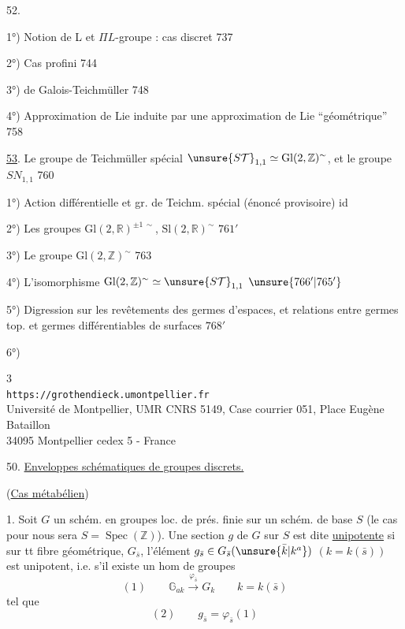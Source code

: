 52. 

1°) Notion de L et $\Pi L$-groupe : cas discret \hfill 737

2°) Cas profini \hfill 744

3°)  de Galois-Teichmüller \hfill 748

4°) Approximation de Lie induite par une approximation de Lie ``géométrique'' \hfill 758

\uline{53}. Le groupe de Teichmüller spécial $\unsure{S\mathcal T}_{1,1}\simeq\mathrm{Gl}(2,\mathbb Z)^{\sim}$, et le groupe $SN_{1,1}$ \hfill 760

1°) Action différentielle et gr. de Teichm. spécial (énoncé provisoire) \hfill id

2°) Les groupes $\mathrm{Gl}(2,\mathbb R)^{\pm1\,\sim}$, $\mathrm{Sl}(2,\mathbb R)^{\sim}$ \hfill $761'$

3°) Le groupe $\mathrm{Gl}(2,\mathbb Z)^{\sim}$ \hfill 763

4°) L'isomorphisme $\mathrm{Gl}(2,\mathbb Z)^{\sim}\simeq\unsure{S\mathcal T}_{1,1}$ \hfill $\unsure{766'|765'}$

5°) Digression sur les revêtements des germes d'espaces, et relations entre germes top. et germes différentiables de surfaces \hfill $768'$

6°)



\begin{center}
\small
3\\
\texttt{https://grothendieck.umontpellier.fr}\\
Université de Montpellier, UMR CNRS 5149, Case courrier 051, Place Eugène Bataillon\\
34095 Montpellier cedex 5 - France
\end{center}


50. \uline{Enveloppes schématiques de groupes discrets.}

(\uline{Cas métabélien})

1. Soit $G$ un schém. en groupes loc. de prés. finie
sur un schém. de base $S$ (le cas  pour nous sera
$S=\operatorname{Spec}(\mathbb Z)$). Une section $g$ de $G$ sur $S$ est dite
\uline{unipotente} si sur tt fibre géométrique,
 $G_{\bar s}$, l'élément
$g_{\bar s}\in G_{\bar s}(\unsure{\bar k|k^a})$
$(k=k(\bar s))$ est unipotent, i.e. s'il existe un hom de groupes
\[
(1)\qquad \mathbb G_{ak}\xrightarrow{\varphi_{\bar s}}G_k
\qquad k=k(\bar s)
\]
tel que
\[
(2)\qquad g_{\bar s}=\varphi_{\bar s}(1)
\]

